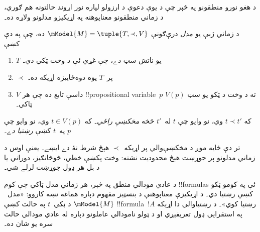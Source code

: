 \documentclass[../../../include/open-logic-section]{subfiles}
\begin{document}
د هغو نورو منطقونو په څېر چې د يوې دعوې د ارزولو لپاره نور
اړوند حالتونه هم ګوري، د زماني منطقونو معناپوهنه په اړيکيزو
مدلونو ولاړه ده۔

\begin{defn}
  د زماني ژبې يو \emph{مدل} درې‌ګونې
  $\mModel{M} = \tuple{T, \prec, V}$ ده، چې په دې کښې
  \begin{enumerate}
  \item $T$ يو ناتش سټ دے، چې غړي ئې د وخت ټکي دي۔
  \item $\prec$ پر~$T$ يوه دوه‌ځاييزه اړيکه ده۔
  \item $V$ داسې تابع ده چې هر !!{propositional
    variable}~$p$ ته د وخت د ټکو يو سټ $V(p)$ ټاکي۔
  \end{enumerate}
  که $t \prec t'$ وي، نو وايو چې $t$ له~$t'$ څخه \emph{مخکښې راځي}۔
  که $t \in V(p)$ وي، نو وايو چې $p$ په~$t$ کښې \emph{رښتيا دے}۔
\end{defn}

تر دې ځايه موږ د مخکښې‌والي پر اړيکه~$\prec$ هېڅ شرط نۀ دے ايښے۔
يعنې اوس د زماني مدلونو پر جوړښت هېڅ محدوديت نشته: وخت پکښې خطي،
څوڅانګيز، دوراني يا د بل هر ډول جوړښت لرلے شي۔

د عادي مودالي منطق په څېر، هر زماني مدل ټاکي چې کوم !!{formula}s
ئې په کومو ټکو کښې رښتيا دي۔ د اړيکيزې معناپوهنې د بنسټيز مفهوم
دپاره هماغه نښه کاروو: «مدل~$\mModel{M}$ د ټکي~$t$ په حالت کښې
!!{formula}~$!A$ رښتيا کوي»۔ د رښتياوالي دا اړيکه په استقرايي ډول
تعريفېږي او د ټولو نا‌مودالي عاملونو دپاره له عادي مودالي حالت سره
يو شان ده۔
\end{document}
